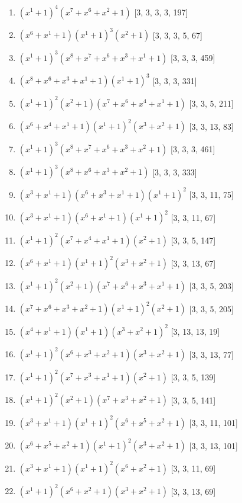 \documentclass[10pt,twocolumn]{article}
\begin{document}
\begin{enumerate}
\item $(x^{1} + 1)^{4}(x^{7} + x^{6} + x^{2} + 1)$  [3, 3, 3, 3, 197]
\item $(x^{6} + x^{1} + 1)(x^{1} + 1)^{3}(x^{2} + 1)$  [3, 3, 3, 5, 67]
\item $(x^{1} + 1)^{3}(x^{8} + x^{7} + x^{6} + x^{3} + x^{1} + 1)$  [3, 3, 3, 459]
\item $(x^{8} + x^{6} + x^{3} + x^{1} + 1)(x^{1} + 1)^{3}$  [3, 3, 3, 331]
\item $(x^{1} + 1)^{2}(x^{2} + 1)(x^{7} + x^{6} + x^{4} + x^{1} + 1)$  [3, 3, 5, 211]
\item $(x^{6} + x^{4} + x^{1} + 1)(x^{1} + 1)^{2}(x^{3} + x^{2} + 1)$  [3, 3, 13, 83]
\item $(x^{1} + 1)^{3}(x^{8} + x^{7} + x^{6} + x^{3} + x^{2} + 1)$  [3, 3, 3, 461]
\item $(x^{1} + 1)^{3}(x^{8} + x^{6} + x^{3} + x^{2} + 1)$  [3, 3, 3, 333]
\item $(x^{3} + x^{1} + 1)(x^{6} + x^{3} + x^{1} + 1)(x^{1} + 1)^{2}$  [3, 3, 11, 75]
\item $(x^{3} + x^{1} + 1)(x^{6} + x^{1} + 1)(x^{1} + 1)^{2}$  [3, 3, 11, 67]
\item $(x^{1} + 1)^{2}(x^{7} + x^{4} + x^{1} + 1)(x^{2} + 1)$  [3, 3, 5, 147]
\item $(x^{6} + x^{1} + 1)(x^{1} + 1)^{2}(x^{3} + x^{2} + 1)$  [3, 3, 13, 67]
\item $(x^{1} + 1)^{2}(x^{2} + 1)(x^{7} + x^{6} + x^{3} + x^{1} + 1)$  [3, 3, 5, 203]
\item $(x^{7} + x^{6} + x^{3} + x^{2} + 1)(x^{1} + 1)^{2}(x^{2} + 1)$  [3, 3, 5, 205]
\item $(x^{4} + x^{1} + 1)(x^{1} + 1)(x^{3} + x^{2} + 1)^{2}$  [3, 13, 13, 19]
\item $(x^{1} + 1)^{2}(x^{6} + x^{3} + x^{2} + 1)(x^{3} + x^{2} + 1)$  [3, 3, 13, 77]
\item $(x^{1} + 1)^{2}(x^{7} + x^{3} + x^{1} + 1)(x^{2} + 1)$  [3, 3, 5, 139]
\item $(x^{1} + 1)^{2}(x^{2} + 1)(x^{7} + x^{3} + x^{2} + 1)$  [3, 3, 5, 141]
\item $(x^{3} + x^{1} + 1)(x^{1} + 1)^{2}(x^{6} + x^{5} + x^{2} + 1)$  [3, 3, 11, 101]
\item $(x^{6} + x^{5} + x^{2} + 1)(x^{1} + 1)^{2}(x^{3} + x^{2} + 1)$  [3, 3, 13, 101]
\item $(x^{3} + x^{1} + 1)(x^{1} + 1)^{2}(x^{6} + x^{2} + 1)$  [3, 3, 11, 69]
\item $(x^{1} + 1)^{2}(x^{6} + x^{2} + 1)(x^{3} + x^{2} + 1)$  [3, 3, 13, 69]

\end{enumerate}
\end{document}
